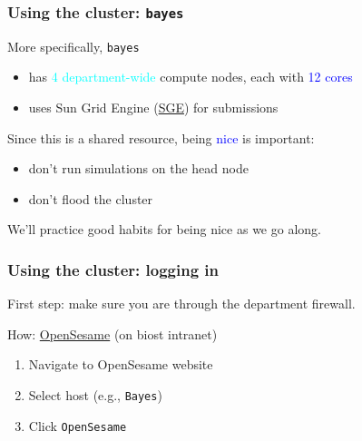 \documentclass[12pt, 
hyperref={colorlinks=true, linkcolor=BlueViolet, urlcolor=BlueViolet},dvipsnames]{beamer}
\begin{document}
\begin{frame}
\frametitle{Using the cluster: \texttt{bayes}}
More specifically, \texttt{bayes} \vspace{-0.3cm} \pause
\begin{itemize}
\item has \textcolor{cyan}{4 department-wide} compute nodes, each with \textcolor{blue}{12 cores} \pause
\item uses Sun Grid Engine (\href{https://en.wikipedia.org/wiki/Oracle_Grid_Engine}{SGE}) for submissions \pause
\end{itemize}

Since this is a shared resource, being \textcolor{blue}{nice} is important: \vspace{-0.3cm} \pause
\begin{itemize}
\item don't run simulations on the head node \pause
\item don't flood the cluster \pause
\end{itemize}

We'll practice good habits for being nice as we go along.
\end{frame}

\begin{frame}
\frametitle{Using the cluster: logging in}
First step: make sure you are through the department firewall.

How: \href{https://apps.biostat.washington.edu/sesame/}{OpenSesame} (on biost intranet) \vspace{-0.3cm}
\begin{enumerate}
\item Navigate to OpenSesame website
\item Select host (e.g., \texttt{Bayes})
\item Click \texttt{OpenSesame}
\end{enumerate}
\end{frame}
\end{document}
